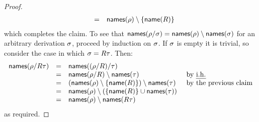 \begin{proof}
\[\begin{array}{rcll}
                         & = & \mathsf{names}(\rho) \setminus \{\mathsf{name}(R)\} \\
  \end{array}
\]
which completes the claim.
To see that $\mathsf{names}(\rho/\sigma) = \mathsf{names}(\rho) \setminus \mathsf{names}(\sigma)$
for an arbitrary derivation $\sigma$,
proceed by induction on $\sigma$.
If $\sigma$ is empty it is trivial, so
consider the case in which $\sigma = R\tau$.
Then:
\[
  \begin{array}{rcll}
  \mathsf{names}(\rho/R\tau) & = & \mathsf{names}((\rho/R)/\tau) \\
                                     & = & \mathsf{names}(\rho/R) \setminus \mathsf{names}(\tau) & \text{ by {\em i.h.}} \\
                                     & = & (\mathsf{names}(\rho) \setminus \{\mathsf{name}(R)\}) \setminus \mathsf{names}(\tau) & \text{ by the previous claim} \\
                                     & = & \mathsf{names}(\rho) \setminus (\{\mathsf{name}(R)\} \cup \mathsf{names}(\tau)) \\
                                     & = & \mathsf{names}(\rho) \setminus \mathsf{names}(R\tau) \\
  \end{array}
\]
as required.
\end{proof}

